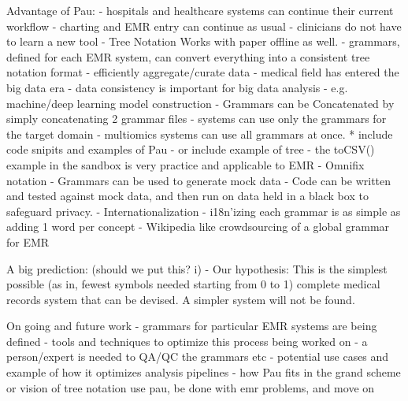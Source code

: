 \documentclass[journal]{IEEEtran}
\begin{document}
Advantage of Pau:
	- hospitals and healthcare systems can continue their current workflow
		- charting and EMR entry can continue as usual 
		- clinicians do not have to learn a new tool
    - Tree Notation Works with paper offline as well.
	- grammars, defined for each EMR system, can convert everything into a
	  consistent tree notation format
		- efficiently aggregate/curate data 
		- medical field has entered the big data era
			- data consistency is important for big data analysis
				- e.g. machine/deep learning model construction
    - Grammars can be Concatenated by simply concatenating 2 grammar files
     - systems can use only the grammars for the target domain
     - multiomics systems can use all grammars at once.
	* include code snipits and examples of Pau
		- or include example of tree
			- the toCSV() example in the sandbox is very practice
			  and applicable to EMR
  - Omnifix notation
  - Grammars can be used to generate mock data
   - Code can be written and tested against mock data, and then run on data held in a black box to safeguard privacy.
  - Internationalization
   - i18n'izing each grammar is as simple as adding 1 word per concept
  - Wikipedia like crowdsourcing of a global grammar for EMR

A big prediction: (should we put this? i)
 - Our hypothesis: This is the simplest possible (as in, fewest symbols needed starting from 0 to 1) complete medical records system that can be devised. A simpler system will not be found.

On going and future work
	- grammars for particular EMR systems are being defined
		- tools and techniques to optimize this process being worked on
		- a person/expert is needed to QA/QC the grammars etc
	- potential use cases and example of how it optimizes analysis pipelines
	- how Pau fits in the grand scheme or vision of tree notation
	use pau, be done with emr problems, and move on
\fi










%
\end{document}

